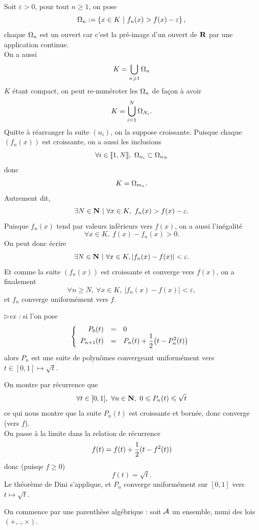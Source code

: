 \documentclass[a4paper,11pt, twoside]{article}
\begin{document}
\begin{Proof}
  Soit $\varepsilon >0$, pour tout $n\geqslant 1$, on pose 
  $$\O_n:=\left\{x\in K \ |\ f_n(x)>f(x)-\varepsilon\right\},$$
  chaque $\Omega_n$ est un ouvert car c'est la pré-image d'un ouvert de $\mathbf R$ par une application continue.\\
  On a aussi 
  $$K=\bigcup_{n\geqslant 1}\Omega_n$$
  $K$ étant compact, on peut re-numéroter les $\Omega_n$ de façon à avoir 
  $$K=\bigcup_{i=1}^N\Omega_{N_i}.$$
  Quitte à réarranger la suite $(n_i)$, on la suppose croissante. Puisque chaque $\left(f_n(x)\right)$ est croissante, on a aussi les inclusions 
  $$\forall i\in \llbracket 1,N\rrbracket,\ \O_{n_i}\subset\O_{n_N}$$
  donc 
  $$K=\Omega_{m_n}.$$
  Autrement dit,
  $$\exists N\in\mathbf N \ |\ \forall x\in K,\ f_n(x)> f(x) - \varepsilon.$$
  Puisque $f_n(x)$ tend par valeurs inférieurs vers $f(x)$, on a aussi l'inégalité 
  $$\forall x\in K,\ f(x)-f_n(x)>0.$$
  On peut donc écrire 
  $$\exists N\in\N \ |\ \forall x\in K, |f_n(x) - f(x)| < \varepsilon.$$
  Et comme la suite $\left(f_n(x)\right)$ est croissante et converge vers $f(x)$, on a finalement
  $$\forall n\geqslant N,\ \forall x\in K,\ |f_n(x)-f(x)|< \varepsilon,$$
  et $f_n$ converge uniformément vers $f$.
\end{Proof}


$\triangleright$\emph{ex :} si l'on pose 
$$\left\{\begin{array}{rcl}
P_0(t)&=&0\\
P_{n+1}(t)&=&P_n(t)+\displaystyle\frac12\big(t-P^2_n(t)\big)
\end{array}\right.$$
alors $P_n$ est une suite de polynômes convergeant uniformément vers $t\in[0,1]\longmapsto \sqrt t.$


\begin{Proof}
  On montre par récurrence que 
  $$\forall t\in[0,1],\ \forall n\in\mathbf N,\ 0\leqslant P_n(t)\leqslant \sqrt t$$
  ce qui nous montre que la suite $P_n(t)$ est croissante et bornée, donc converge (vers $f$).\\
  On passe à la limite dans la relation de récurrence 
  $$f(t)=f(t)+\displaystyle\frac12(t-f^2(t))$$
  donc (puisqe $f\geqslant0$)
  $$f(t)=\sqrt t.$$
  Le théorème de Dini s'applique, et $P_n$ converge uniformément sur $[0,1]$ vers $t\mapsto\sqrt t.$
\end{Proof}






On commence par une parenthèse algébrique : soit $\mathcal A$ un ensemble, muni des lois $(+,.,\times)$.
\end{document}
